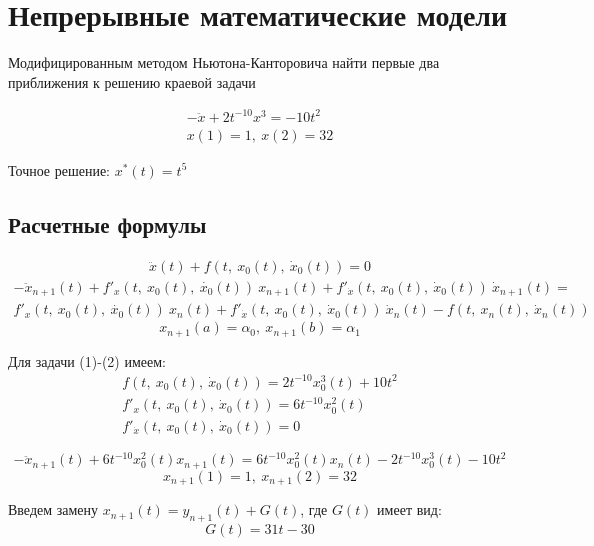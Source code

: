 \documentclass[12pt]{article}
\begin{document}
\section*{Непрерывные математические модели}

Модифицированным методом Ньютона-Канторовича найти первые два приближения к решению краевой задачи

\begin{gather}
	-\ddot{x} + 2t^{-10}x^3 = -10t^2 \\
	x(1)=1,\ x(2)=32
\end{gather}

Точное решение: $x^*(t) = t^5$

\subsection*{Расчетные формулы}



\begin{gather}
\ddot{x}(t) + f(t,\ x_0(t),\ \dot{x}_0(t)) = 0
\end{gather}
\begin{multline}
	-\ddot{x}_{n+1}(t) + f'_x(t,\ x_0(t),\ \dot{x_0}(t))\ x_{n+1}(t) +
	f'_{\dot{x}}(t,\ x_0(t),\ \dot{x}_0(t))\ \dot{x}_{n+1}(t) = \\
	f'_x(t,\ x_0(t),\ \dot{x_0}(t))\ x_n(t) +
	f'_{\dot{x}}(t,\ x_0(t),\ \dot{x}_0(t))\ \dot{x}_n(t) -
	f(t,\ x_n(t),\ \dot{x}_n(t))
\end{multline}
\begin{equation}
	x_{n+1}(a) = \alpha_0,\ x_{n+1}(b) = \alpha_1
\end{equation}

Для задачи (1)-(2) имеем:
\begin{gather*}
	f(t,\ x_0(t),\ \dot{x}_0(t)) = 2t^{-10}x^3_0(t) + 10t^2 \\
	f'_x(t,\ x_0(t),\ \dot{x}_0(t)) = 6t^{-10}x^2_0(t) \\
	f'_{\dot{x}}(t,\ x_0(t),\ \dot{x}_0(t)) = 0
\end{gather*}

\begin{equation}
-\ddot{x}_{n+1}(t) + 6t^{-10}x^2_0(t)x_{n+1}(t) =
 6t^{-10}x^2_0(t)x_n(t) - 2t^{-10}x^3_0(t) - 10t^2
\end{equation}
\begin{equation}
x_{n+1}(1)=1,\ x_{n+1}(2)=32
\end{equation}

Введем замену $x_{n+1}(t) = y_{n+1}(t) + G(t)$, где $G(t)$ имеет вид:
\begin{equation}
G(t) = 31t - 30
\end{equation}
\end{document}
